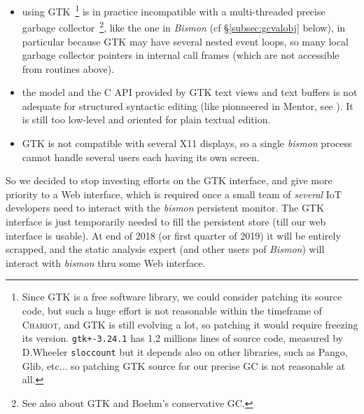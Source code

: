 \begin{itemize}
\item using GTK~\footnote{Since GTK is a free software library, we
  could consider patching its source code, but such a huge effort is
  not reasonable within the timeframe of \textsc{Chariot}, and GTK is
  still evolving a lot, so patching it would require freezing its
  version. \texttt{gtk+-3.24.1} has 1.2 millions lines of source code,
  measured by D.Wheeler \texttt{sloccount} but it depends also on
  other libraries, such as Pango, Glib, etc... so patching GTK source
  for our precise GC is not reasonable at all.}  is in practice
  incompatible with a multi-threaded precise garbage
  collector~\footnote{See also
     about GTK and
    Boehm's conservative GC.}, like the one in \emph{Bismon} (cf
  §\ref{subsec:gcvalobj} below), in particular because GTK may have
  several nested event loops, so many local garbage collector pointers
  in internal call frames (which are not accessible from routines
  above).

    \item the model and the C API provided by GTK text views and text
      buffers is not adequate for structured syntactic editing (like
      pionneered in Mentor, see \cite{donzeaugouge:inria-mentor}). It is still too low-level and oriented for plain textual edition.

      \item GTK is not compatible with several X11 displays, so a
        single \emph{bismon} process cannot handle several users each
        having its own screen.
\end{itemize}

So we decided to stop investing efforts on the GTK interface, and give
more priority to a Web interface, which is required once a small team
of \emph{several} IoT developers need to interact with the
\emph{bismon} persistent monitor. The GTK interface is just
temporarily needed to fill the persistent store (till our web
interface is usable). At end of 2018 (or first quarter of 2019) it
will be entirely scrapped, and the static analysis expert (and other
users pof \emph{Bismon}) will interact with \emph{bismon} thru some
Web interface.

